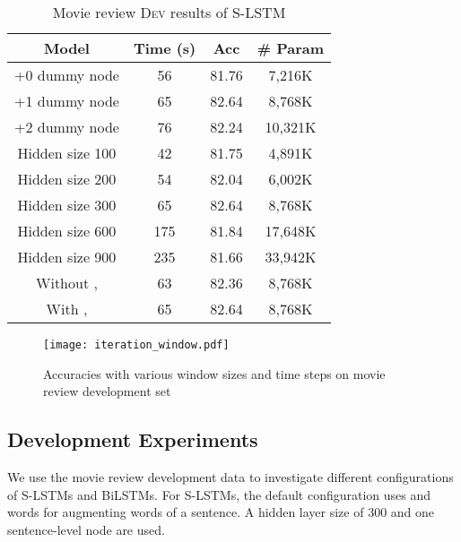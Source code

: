 \documentclass[11pt,a4paper]{article}
\begin{document}
\begin{table}[t]
	\centering
	\tabcolsep=0.1cm
	\begin{tabular}{|ccc|ccc|}
		\hline
		\multicolumn{3}{|c|}{\textbf{Model}}& \textbf{Time (s)} & \textbf{Acc} & \textbf{\# Param}\\ 
		\hline

		\multicolumn{3}{|c|}{+0 dummy node}&56&81.76 &7,216K\\ 
		\multicolumn{3}{|c|}{+1 dummy node}&65&82.64&8,768K\\ 
		\multicolumn{3}{|c|}{+2 dummy node}&76&82.24 &10,321K\\ 
		\hline
		\multicolumn{3}{|c|}{Hidden size 100 }&42&81.75 &4,891K\\
		\multicolumn{3}{|c|}{Hidden size 200}&54&82.04 &6,002K\\ 
		\multicolumn{3}{|c|}{Hidden size 300}&65&82.64 &8,768K\\ 
		\multicolumn{3}{|c|}{Hidden size 600}&175&81.84&17,648K\\
		\multicolumn{3}{|c|}{Hidden size 900}&235&81.66 &33,942K\\ 
		\hline
		\multicolumn{3}{|c|}{Without ,  }&63&82.36&8,768K\\ 
		\multicolumn{3}{|c|}{With ,  }&65&82.64&8,768K \\
		\hline
	\end{tabular}
	\caption{\label{tab:movie_dev}Movie review \textsc{Dev} results of S-LSTM}
\end{table}


\begin{figure}
\vspace{-0.4em}
\centering
\texttt{[image: iteration\_window.pdf]}
\vspace{-0.8em}
\caption{Accuracies with various window sizes and time steps on movie review development set}
\label{fig:iteration_window}
\end{figure}


\subsection{Development Experiments}
We use the movie review development data to investigate different configurations of S-LSTMs and BiLSTMs. 
For S-LSTMs, the default configuration uses  and  words for augmenting words of a sentence.
A hidden layer size of 300 and one sentence-level node are used.
\end{document}
